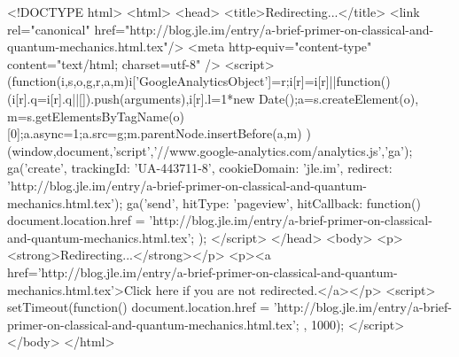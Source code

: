 <!DOCTYPE html>
<html>
<head>
<title>Redirecting...</title>
<link rel="canonical" href="http://blog.jle.im/entry/a-brief-primer-on-classical-and-quantum-mechanics.html.tex"/>
<meta http-equiv="content-type" content="text/html; charset=utf-8" />
<script>
(function(i,s,o,g,r,a,m){i['GoogleAnalyticsObject']=r;i[r]=i[r]||function(){
(i[r].q=i[r].q||[]).push(arguments)},i[r].l=1*new Date();a=s.createElement(o),
m=s.getElementsByTagName(o)[0];a.async=1;a.src=g;m.parentNode.insertBefore(a,m)
})(window,document,'script','//www.google-analytics.com/analytics.js','ga');
ga('create', { trackingId: 'UA-443711-8', cookieDomain: 'jle.im', redirect: 'http://blog.jle.im/entry/a-brief-primer-on-classical-and-quantum-mechanics.html.tex'});
ga('send', { hitType: 'pageview', hitCallback: function() { document.location.href = 'http://blog.jle.im/entry/a-brief-primer-on-classical-and-quantum-mechanics.html.tex'; } });
</script>
</head>
<body>
  <p><strong>Redirecting...</strong></p>
  <p><a href='http://blog.jle.im/entry/a-brief-primer-on-classical-and-quantum-mechanics.html.tex'>Click here if you are not redirected.</a></p>
  <script>
    setTimeout(function() { document.location.href = 'http://blog.jle.im/entry/a-brief-primer-on-classical-and-quantum-mechanics.html.tex'; }, 1000);
  </script>
</body>
</html>
